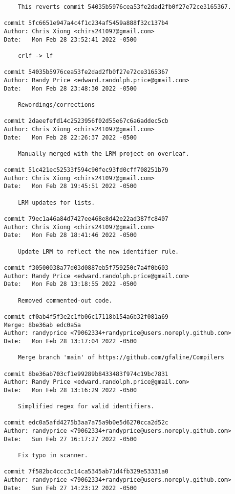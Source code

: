 {\begin{verbatim}
    This reverts commit 54035b5976cea53fe2dad2fb0f27e72ce3165367.

commit 5fc6651e947a4c4f1c234af5459a888f32c137b4
Author: Chris Xiong <chirs241097@gmail.com>
Date:   Mon Feb 28 23:52:41 2022 -0500

    crlf -> lf

commit 54035b5976cea53fe2dad2fb0f27e72ce3165367
Author: Randy Price <edward.randolph.price@gmail.com>
Date:   Mon Feb 28 23:48:30 2022 -0500

    Rewordings/corrections

commit 2daeefefd14c2523956f02d55e67c6a6addec5cb
Author: Chris Xiong <chirs241097@gmail.com>
Date:   Mon Feb 28 22:26:37 2022 -0500

    Manually merged with the LRM project on overleaf.

commit 51c421ec52533f594c90fec93fd0cff708251b79
Author: Chris Xiong <chirs241097@gmail.com>
Date:   Mon Feb 28 19:45:51 2022 -0500

    LRM updates for lists.

commit 79ec1a46a84d7427ee468e8d42e22ad387fc8407
Author: Chris Xiong <chirs241097@gmail.com>
Date:   Mon Feb 28 18:41:46 2022 -0500

    Update LRM to reflect the new identifier rule.

commit f30500038a77d03d0887eb5f759250c7a4f0b603
Author: Randy Price <edward.randolph.price@gmail.com>
Date:   Mon Feb 28 13:18:55 2022 -0500

    Removed commented-out code.

commit cf0ab4f5f3e2c1fb06c17118b154a6b32f081a69
Merge: 8be36ab edc0a5a
Author: randyprice <79062334+randyprice@users.noreply.github.com>
Date:   Mon Feb 28 13:17:04 2022 -0500

    Merge branch 'main' of https://github.com/gfaline/Compilers

commit 8be36ab703cf1e99289b8433483f974c19bc7831
Author: Randy Price <edward.randolph.price@gmail.com>
Date:   Mon Feb 28 13:16:29 2022 -0500

    Simplified regex for valid identifiers.

commit edc0a5afd4275b3aa7a75a9b0e5d6270cca2d52c
Author: randyprice <79062334+randyprice@users.noreply.github.com>
Date:   Sun Feb 27 16:17:27 2022 -0500

    Fix typo in scanner.

commit 7f582bc4ccc3c14ca5345ab71d4fb329e53331a0
Author: randyprice <79062334+randyprice@users.noreply.github.com>
Date:   Sun Feb 27 14:23:12 2022 -0500


\end{verbatim}}
